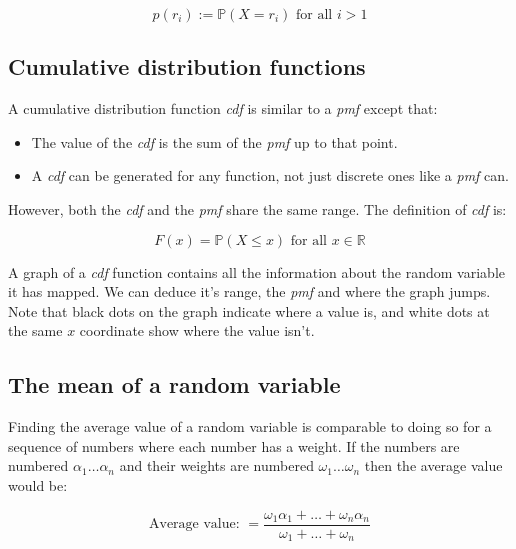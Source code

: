 \begin{dmath*}
	p(r_i) := \mathbb{P}(X = r_i) \textrm{ for all $i > 1$}
\end{dmath*}


\subsection{Cumulative distribution functions}

A cumulative distribution function {\it cdf} is similar to a {\it pmf} except
that:

\begin{itemize}
	\item The value of the {\it cdf} is the sum of the {\it pmf} up to that 
	point.
	\item A {\it cdf} can be generated for any function, not just discrete ones
	like a {\it pmf} can.
\end{itemize}

However, both the {\it cdf} and the {\it pmf} share the same range. The
definition of {\it cdf} is:

\begin{dmath*}
	{F(x) = \mathbb{P}(X \leq x)} \textrm{ for all $x \in \mathbb{R}$}
\end{dmath*}

A graph of a {\it cdf} function contains all the information about the random
variable it has mapped. We can deduce it's range, the {\it pmf} and where the
graph jumps. Note that black dots on the graph indicate where a value is, and
white dots at the same $x$ coordinate show where the value isn't.

\subsection{The mean of a random variable}

Finding the average value of a random variable is comparable to doing so for a
sequence of numbers where each number has a weight. If the numbers are numbered
$\alpha_1 \dots \alpha_n$ and their weights are numbered $\omega_1 \dots
\omega_n$ then the average value would be:

\begin{dmath*}
	\textrm{Average value: } = \frac{\omega_1\alpha_1 + \dots + \omega_n\alpha_n}{\omega_1 + \dots + \omega_n}
\end{dmath*}


